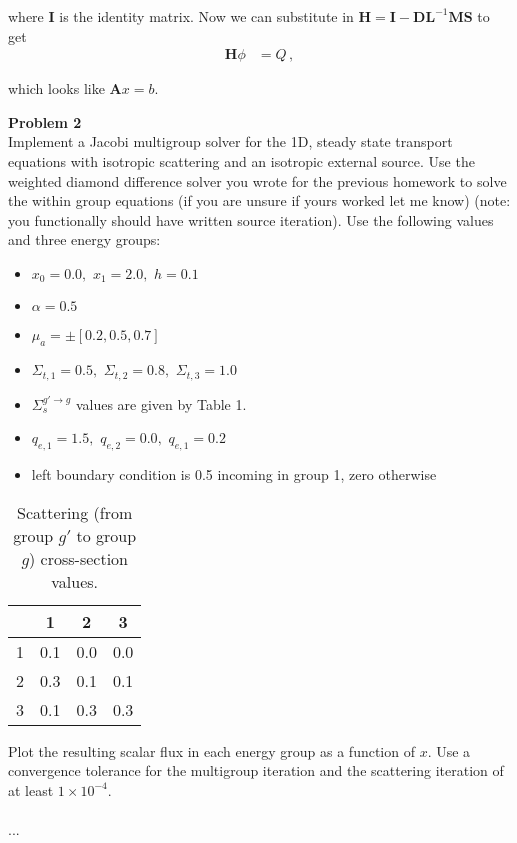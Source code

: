 \documentclass[10pt]{article}
\begin{document}
where \textbf{I} is the identity matrix. Now we can substitute in  $\textbf{H} = \textbf{I} - \textbf{D}\textbf{L} ^{-1}\textbf{MS}$ to get 
%
\begin{align*}
    \textbf{H}\phi &= Q \,,
\end{align*} 

which looks like $\textbf{A}x = b$.





\newpage
\noindent \textbf{Problem 2}\\
Implement a Jacobi multigroup solver for the 1D, steady state transport equations with isotropic scattering and an isotropic external source. Use the weighted diamond difference solver you wrote for the previous homework to solve the within group equations (if you are unsure if yours worked let me know) (note: you functionally should have written source iteration). Use the following values and three energy groups:
%
\begin{itemize}
\setlength\itemsep{-3pt}
    \item $x_0=0.0,\,\,x_1=2.0,\,\,h=0.1$
    \item $\alpha=0.5$
    \item $\mu_a = \pm[0.2,0.5,0.7]$
    \item $\Sigma_{t,1}=0.5,\,\, \Sigma_{t,2}=0.8,\,\, \Sigma_{t,3}=1.0$
    \item $\Sigma_s^{g' \rightarrow g}$ values are given by Table 1.
    \item $q_{e,1}=1.5,\,\, q_{e,2}=0.0,\,\, q_{e,1}=0.2$
    \item left boundary condition is 0.5 incoming in group 1, zero otherwise
\end{itemize}
%
\begin{table}[htb!]
	\centering
	\setlength{\tabcolsep}{10pt}
	\begin{tabular}{|c|c|c|c|}
		\hline
		\diagbox[width=40pt, height=20pt]{$g'$}{$g$} & 1 & 2 & 3 \\ \hline
		1 & 0.1 & 0.0 & 0.0 \\ 
		2 & 0.3 & 0.1 & 0.1 \\ 
		3 & 0.1 & 0.3 & 0.3 \\ \hline
	\end{tabular}
	\caption{Scattering (from group $g'$ to group $g$) cross-section values.}
\end{table}


Plot the resulting scalar flux in each energy group as a function of $x$. Use a convergence tolerance for the multigroup iteration and the scattering iteration of at least $1 \times 10^{-4}$.\\\\


...






\end{document}
